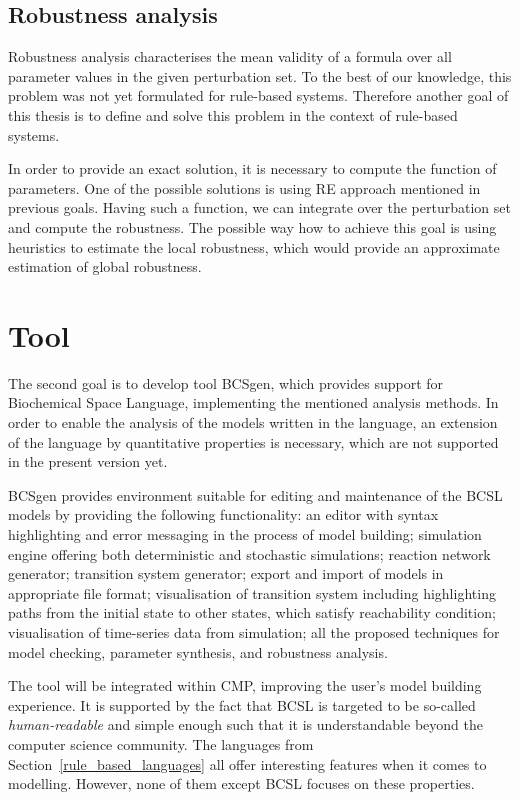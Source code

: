 \documentclass[11pt,a4paper]{report}
\begin{document}
\subsection{Robustness analysis}

Robustness analysis characterises the mean validity of a formula over all parameter values in the given perturbation set. To the best of our knowledge, this problem was not yet formulated for rule-based systems. Therefore another goal of this thesis is to define and solve this problem in the context of rule-based systems. 

In order to provide an exact solution, it is necessary to compute the function of parameters. One of the possible solutions is using RE approach mentioned in previous goals. Having such a function, we can integrate over the perturbation set and compute the robustness. The possible way how to achieve this goal is using heuristics to estimate the local robustness, which would provide an approximate estimation of global robustness.

\section{Tool}

The second goal is to develop tool BCSgen, which provides support for Biochemical Space Language, implementing the mentioned analysis methods. In order to enable the analysis of the models written in the language, an extension of the language by quantitative properties is necessary, which are not supported in the present version yet.

BCSgen provides environment suitable for editing and maintenance of the BCSL models by providing the following functionality: an editor with syntax highlighting and error messaging in the process of model building; simulation engine offering both deterministic and stochastic simulations; reaction network generator; transition system generator; export and import of models in appropriate file format; visualisation of transition system including highlighting paths from the initial state to other states, which satisfy reachability condition; visualisation of time-series data from simulation; all the proposed techniques for model checking, parameter synthesis, and robustness analysis.

The tool will be integrated within CMP, improving the user's model building experience. It is supported by the fact that BCSL is targeted to be so-called \emph{human-readable} and simple enough such that it is understandable beyond the computer science community. The languages from Section~\ref{rule_based_languages} all offer interesting features when it comes to modelling. However, none of them except BCSL focuses on these properties.
\end{document}
